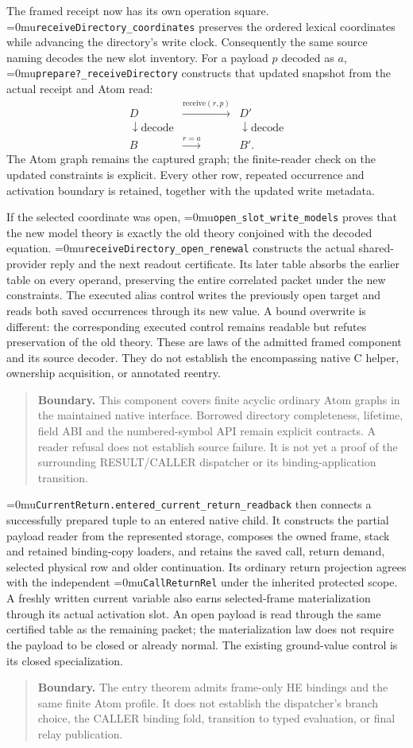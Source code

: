\documentclass[11pt,a4paper]{article}
\newcommand{\name}[1]{\textup{\Urlmuskip=0mu\relax\nolinkurl{#1}}}
\newcommand{\scope}[1]{\par\smallskip\begin{quote}\small\textbf{Boundary.} #1\end{quote}}
\begin{document}
The framed receipt now has its own operation square.
\name{receiveDirectory_coordinates} preserves the ordered lexical
coordinates while advancing the directory's write clock. Consequently the
same source naming decodes the new slot inventory. For a payload $p$ decoded
as $a$, \name{prepare?_receiveDirectory} constructs that updated snapshot
from the actual receipt and Atom read:
\[
\begin{array}{ccc}
 D & \xrightarrow{\mathrm{receive}(r,p)} & D' \\
 \downarrow\mathrm{decode} && \downarrow\mathrm{decode} \\
 B & \xrightarrow{r=a} & B'.
\end{array}
\]
The Atom graph remains the captured graph; the finite-reader check on the
updated constraints is explicit. Every other row, repeated occurrence and
activation boundary is retained, together with the updated write metadata.

If the selected coordinate was open, \name{open_slot_write_models} proves
that the new model theory is exactly the old theory conjoined with the
decoded equation. \name{receiveDirectory_open_renewal} constructs the actual
shared-provider reply and the next readout certificate. Its later table
absorbs the earlier table on every operand, preserving the entire correlated
packet under the new constraints. The executed alias control writes the
previously open target and reads both saved occurrences through its new value.
A bound overwrite is different: the corresponding executed control remains
readable but refutes preservation of the old theory. These are laws of the
admitted framed component and its source decoder. They do not establish the
encompassing native C helper, ownership acquisition, or annotated reentry.
\scope{This component covers finite acyclic ordinary Atom graphs in the
maintained native interface. Borrowed directory completeness, lifetime,
field ABI and the numbered-symbol API remain explicit contracts. A reader
refusal does not establish source failure. It is not yet a proof of the
surrounding RESULT/CALLER dispatcher or its binding-application transition.}

\name{CurrentReturn.entered_current_return_readback} then connects a
successfully prepared tuple to an entered native child. It constructs the
partial payload reader from the represented storage, composes the owned
frame, stack and retained binding-copy loaders, and retains the saved call,
return demand, selected physical row and older continuation. Its ordinary
return projection agrees with the independent \name{CallReturnRel} under
the inherited protected scope. A freshly written current variable also earns
selected-frame materialization through its actual activation slot. An open
payload is read through the same certified table as the remaining packet;
the materialization law does not require the payload to be closed or already
normal. The existing ground-value control is its closed specialization.
\scope{The entry theorem admits frame-only HE bindings and the same finite
Atom profile. It does not establish the dispatcher's branch choice, the
CALLER binding fold, transition to typed evaluation, or final relay publication.}
\end{document}
